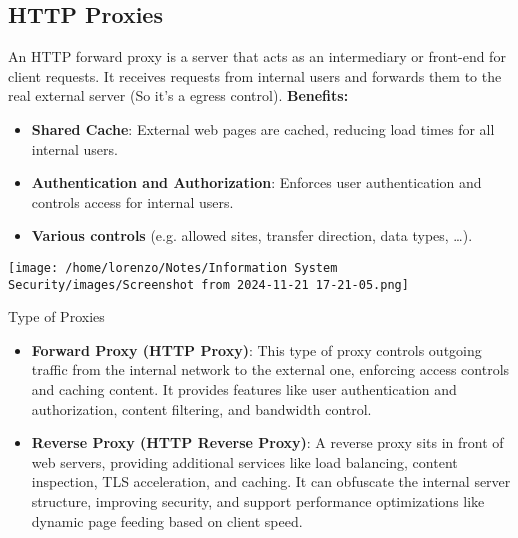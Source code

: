 \subsection{HTTP Proxies}
An HTTP forward proxy is a server that acts as an intermediary or front-end for client requests. It receives requests from internal users and forwards them to the real external server (So it's a egress control).
\textbf{Benefits:}
\\\vspace{-0.8cm}
\begin{minipage}{0.65\textwidth}
	\vspace{0.5cm}
    \begin{itemize}
        \item \textbf{Shared Cache}: External web pages are cached, reducing load times for all internal users.
        \item \textbf{Authentication and Authorization}: Enforces user authentication and controls access for internal users.
        \item \textbf{Various controls} (e.g. allowed sites, transfer direction, data
        types, …).
    \end{itemize} 
\end{minipage} 
\hspace{0.4cm}
\begin{minipage}{0.3\textwidth}
    \centering
    \texttt{[image: /home/lorenzo/Notes/Information System Security/images/Screenshot from 2024-11-21 17-21-05.png]}
\end{minipage}

\begin{quotebox-grey}{Type of Proxies}
    \begin{itemize}
        \item \textbf{Forward Proxy (HTTP Proxy)}: This type of proxy controls outgoing traffic from the internal network to the external one, enforcing access controls and caching content. It provides features like user authentication and authorization, content filtering, and bandwidth control.
        \item \textbf{Reverse Proxy (HTTP Reverse Proxy)}: A reverse proxy sits in front of web servers, providing additional services like load balancing, content inspection, TLS acceleration, and caching. It can obfuscate the internal server structure, improving security, and support performance optimizations like dynamic page feeding based on client speed.
    \end{itemize}
\end{quotebox-grey}

